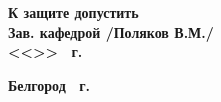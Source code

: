 \documentclass[14pt]{extarticle}
\begin{document}
\begin{titlepage}
\begin{flushleft}
\begin{tabular}{@{}l l@{}}
	\end{tabular}
\end{flushleft}
\vspace{1em}
{\small
\hspace*{10em}\textbf{К защите допустить} \\[-0.5em]
\hspace*{10em}\textbf{Зав. кафедрой \underline{\hspace{4cm}} /Поляков В.М./} \\[0.3em]
\hspace*{12em}\textbf{<<\underline{\hspace{1cm}}>>\underline{\hspace{3cm}} \the\year \ г.}
}

\vspace{1em}
{\centering\small\textbf{Белгород \the\year \ г.}\par}
\end{titlepage}
\end{document}

